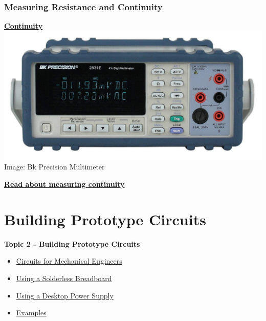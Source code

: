 \documentclass[fleqn]{beamer} %
\newcommand{\sectionIItitle}{Building Prototype Circuits}
\newcommand{\sectionIsubsectionIVtitle}{Measuring Resistance and Continuity}
\newcommand{\sectionIIsubsectionItitle}{Circuits for Mechanical Engineers}
\newcommand{\sectionIIsubsectionIItitle}{Using a Solderless Breadboard}
\newcommand{\sectionIIsubsectionIIItitle}{Using a Desktop Power Supply}
\newcommand{\sectionIIsubsectionIVtitle}{Examples}
\begin{document}
			\begin{frame}
				\frametitle{\sectionIsubsectionIVtitle}
				\underline{{\bf \large Continuity}} \vspace{10mm}\\ 

				\includegraphics[scale=.13]{images/bk_2831e.jpg}
				\vspace{10mm}
				\tiny{Image: Bk Precision Multimeter }

				\textbf{ \href{https://www.fluke.com/en-us/learn/best-practices/test-tools-basics/digital-multimeters/how-to-test-for-continuity-with-a-digital-multimeter}{Read about measuring continuity} } 
	 
			\end{frame}

	
	\section{\sectionIItitle}\label{sectionII}

		\begin{frame}
			\large \textbf{Topic 2 - \sectionIItitle} \vspace{3mm}\\

			\begin{itemize}
				\item \hyperlink{sectionIIsubsectionI}{\sectionIIsubsectionItitle} \vspc %
				\item \hyperlink{sectionIIsubsectionII}{\sectionIIsubsectionIItitle} \vspc %
				\item \hyperlink{sectionIIsubsectionIII}{\sectionIIsubsectionIIItitle} \vspc %
				\item \hyperlink{sectionIIsubsectionIV}{\sectionIIsubsectionIVtitle} \vspc %
			\end{itemize}
		\end{frame}
\end{document}
